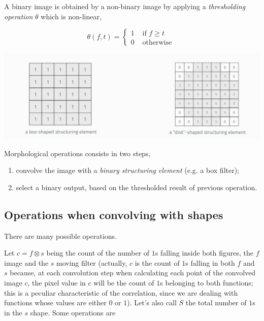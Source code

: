 \documentclass[10pt]{report}
\begin{document}
A binary image is obtained by a non-binary image by applying a
\emph{thresholding operation} \(\theta\) which is non-linear,

\[\theta(f, t) = \left\{\begin{array}{ll} 1 & \mbox{ if } f \geq t\\ 0 & \mbox{ otherwise } \end{array}\right.\]

\begin{center}
\includegraphics[width=.9\linewidth]{./pics/proc/binary-images.jpg}
\end{center}

Morphological operations consists in two steps,

\begin{enumerate}
\item convolve the image with a \emph{binary structuring element} (e.g. a box
filter);
\item select a binary output, based on the thresholded result of previous
operation.
\end{enumerate}

\subsection{Operations when convolving with shapes}
\label{operations-when-convolving-with-shapes}
There are many possible operations.

Let \(c = f \otimes s\) being the count of the number of \(1\)s falling
inside both figures, the \(f\) image and the \(s\) moving filter
(actually, \(c\) is the count of \(1\)s falling in both \(f\) and \(s\)
because, at each convolution step when calculating each point of the
convolved image \(c\), the pixel value in \(c\) will be the count of
\(1\)s belonging to both functions; this is a peculiar characteristic of
the correlation, since we are dealing with functions whose values are
either \(0\) or \(1\)). Let's also call \(S\) the total number of \(1\)s
in the \(s\) shape. Some operations are
\end{document}
